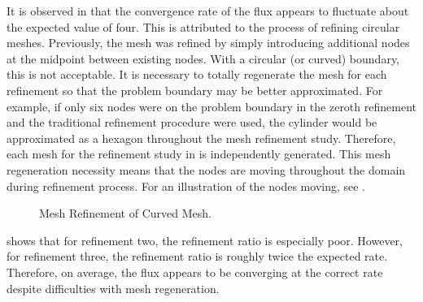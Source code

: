     It is observed in  that the convergence rate of the
    flux appears to fluctuate about the expected value of four. This is
    attributed to the process of refining circular meshes. Previously, the mesh
    was refined by simply introducing additional nodes at the midpoint between
    existing nodes. With a circular (or curved) boundary, this is not
    acceptable. It is necessary to totally regenerate the mesh for each
    refinement so that the problem boundary may be better approximated.  For
    example, if only six nodes were on the problem boundary in the zeroth
    refinement and the traditional refinement procedure were used, the cylinder
    would be approximated as a hexagon throughout the mesh refinement study.
    Therefore, each mesh for the refinement study in  is
    independently generated. This mesh regeneration necessity means that the
    nodes are moving throughout the domain during refinement process. For an
    illustration of the nodes moving, see .

    \begin{figure}
      \centering
      \vspace{0.2in}
      \caption{Mesh Refinement of Curved Mesh.}
      \label{fig:ch03_circle_meshes}
    \end{figure}
    
     shows that for refinement two, the refinement ratio is
    especially poor. However, for refinement three, the refinement ratio is
    roughly twice the expected rate.  Therefore, on average, the flux appears to
    be converging at the correct rate despite difficulties with mesh
    regeneration.

